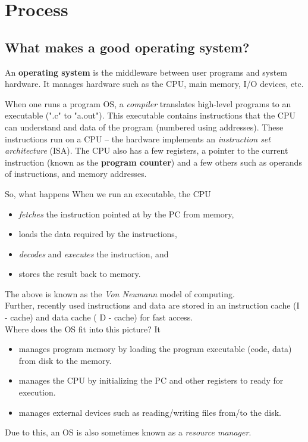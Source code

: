 \documentclass{article}
\begin{document}
\thispagestyle{empty}
\titleBC



\section{Process} %
\label{sec:introduction}

	\subsection{What makes a good operating system?}
	
		An \textbf{operating system} is the middleware between user programs and system hardware. It manages hardware such as the CPU, main memory, I/O devices, etc.

		When one runs a program OS, a \emph{compiler} translates high-level programs to an executable (".c" to "a.out"). This executable contains instructions that the CPU can understand and data of the program (numbered using addresses). These instructions run on a CPU -- the hardware implements an \emph{instruction set architecture} (ISA). The CPU also has a few registers, a pointer to the current instruction (known as the \textbf{program counter}) and a few others such as operands of instructions, and memory addresses.

		So, what happens When we run an executable, the CPU
		\begin{itemize}
			\item \emph{fetches} the instruction pointed at by the PC from memory,
			\item loads the data required by the instructions,
			\item \emph{decodes} and \emph{executes} the instruction, and
			\item stores the result back to memory.
		\end{itemize}
		The above is known as the \emph{Von Neumann} model of computing.\\
		Further, recently used instructions and data are stored in an instruction cache (I - cache) and data cache ( D - cache) for fast access.\\

		Where does the OS fit into this picture? It
		\begin{itemize}
			\item manages program memory by loading the program executable (code, data) from disk to the memory.
			\item manages the CPU by initializing the PC and other registers to ready for execution.
			\item manages external devices such as reading/writing files from/to the disk.
		\end{itemize}
		Due to this, an OS is also sometimes known as a \emph{resource manager}.\\
\end{document}
